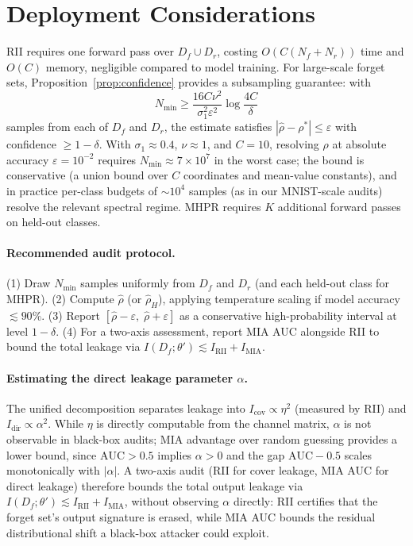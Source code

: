 \documentclass[smallextended]{svjour3}       %
\begin{document}
\section{Deployment Considerations}
\label{sec:deployment}

RII requires one forward pass over $D_f \cup D_r$, costing $O(C(N_f+N_r))$ time and $O(C)$ memory, negligible compared to model training. For large-scale forget sets, Proposition~\ref{prop:confidence} provides a subsampling guarantee: with
\[
N_{\min} \ge \frac{16C\nu^2}{\sigma_1^2\varepsilon^2}\log\frac{4C}{\delta}
\]
samples from each of $D_f$ and $D_r$, the estimate satisfies $|\hat{\rho}-\rho^*| \le \varepsilon$ with confidence $\ge 1-\delta$. With $\sigma_1\approx0.4$, $\nu\approx1$, and $C=10$, resolving $\rho$ at absolute accuracy $\varepsilon=10^{-2}$ requires $N_{\min}\approx7\times10^7$ in the worst case; the bound is conservative (a union bound over $C$ coordinates and mean-value constants), and in practice per-class budgets of $\sim10^4$ samples (as in our MNIST-scale audits) resolve the relevant spectral regime. MHPR requires $K$ additional forward passes on held-out classes.

\paragraph{Recommended audit protocol.}
(1) Draw $N_{\min}$ samples uniformly from $D_f$ and $D_r$ (and each held-out class for MHPR). (2) Compute $\hat{\rho}$ (or $\hat{\rho}_H$), applying temperature scaling if model accuracy $\lesssim 90\%$. (3) Report $[\hat{\rho}-\varepsilon,\;\hat{\rho}+\varepsilon]$ as a conservative high-probability interval at level $1-\delta$. (4) For a two-axis assessment, report MIA AUC alongside RII to bound the total leakage via $I(D_f;\theta') \lesssim I_{\mathrm{RII}} + I_{\mathrm{MIA}}$.

\paragraph{Estimating the direct leakage parameter $\alpha$.}
The unified decomposition separates leakage into $I_{\mathrm{cov}}\propto\eta^2$ (measured by RII) and $I_{\mathrm{dir}}\propto\alpha^2$. While $\eta$ is directly computable from the channel matrix, $\alpha$ is not observable in black-box audits; MIA advantage over random guessing provides a lower bound, since $\mathrm{AUC}>0.5$ implies $\alpha>0$ and the gap $\mathrm{AUC}-0.5$ scales monotonically with $|\alpha|$. A two-axis audit (RII for cover leakage, MIA AUC for direct leakage) therefore bounds the total output leakage via $I(D_f;\theta') \lesssim I_{\mathrm{RII}} + I_{\mathrm{MIA}}$, without observing $\alpha$ directly: RII certifies that the forget set's output signature is erased, while MIA AUC bounds the residual distributional shift a black-box attacker could exploit.
\end{document}
